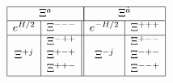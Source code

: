 \begin{equation}
\begin{array}{|c|c||c|c|}
\hline \multicolumn{2}{|c|}{\Xi^a} &
\multicolumn{2}{|c|}{\Xi^{\dot{a}}}\\
\hline
 e^{H/2} & \Xi^{---} & e^{-H/2} & \Xi^{+++} \\
\hline
          & \Xi^{-++} &          & \Xi^{+--} \\
 \Xi^{+j} & \Xi^{+-+} & \Xi^{-j} & \Xi^{-+-} \\
          & \Xi^{++-} &          & \Xi^{--+}\\
\hline
\end{array}    \nonumber
\end{equation}

